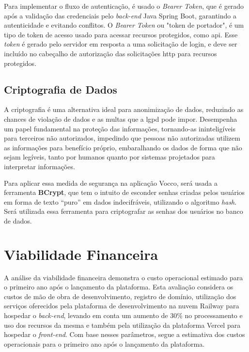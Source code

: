 Para implementar o fluxo de autenticação, é usado o \textit{Bearer Token}, que é gerado após a validação das credenciais pelo \textit{back-end} Java Spring Boot, garantindo a autenticidade e evitando conflitos.
O \textit{Bearer Token} ou "token de portador", é um tipo de token de acesso usado para acessar recursos protegidos, como \ac{api}. Esse \textit{token} é gerado pelo servidor em resposta a uma solicitação de login, e deve ser incluído no cabeçalho de autorização das solicitações \ac{http} para recursos protegidos.


\subsection{Criptografia de Dados}
A criptografia é uma alternativa ideal para anonimização de dados, reduzindo as chances de violação de dados e as multas que a \ac{lgpd} pode impor. Desempenha um papel fundamental na proteção das informações, tornando-as ininteligíveis para terceiros não autorizados, impedindo que pessoas não autorizadas utilizem as informações para benefício próprio, embaralhando os dados de forma que não sejam legíveis, tanto por humanos quanto por sistemas projetados para interpretar informações.

Para aplicar essa medida de segurança na aplicação Vocco, será usada a ferramenta \textbf{BCrypt}, que tem o intuito de esconder senhas criadas pelos usuários em forma de texto “puro” em dados indecifráveis, utilizando o algoritmo \textit{hash}.
Será utilizada essa ferramenta para criptografar as senhas dos usuários no banco de dados. 


\section{Viabilidade Financeira}
A análise da viabilidade financeira demonstra o custo operacional estimado para o primeiro ano após o lançamento da plataforma. Esta avaliação considera os custos de mão de obra de desenvolvimento, registro de domínio, utilização dos serviços oferecidos pela plataforma de desenvolvimento na nuvem Railway para hospedar o \textit{back-end}, levando em conta um aumento de 30\% no processamento e uso dos recursos da mesma e também pela utilização da plataforma Vercel para hospedar o \textit{front-end}. Com base nesses parâmetros, segue a estimativa dos custos operacionais para o primeiro ano após o lançamento da plataforma.

